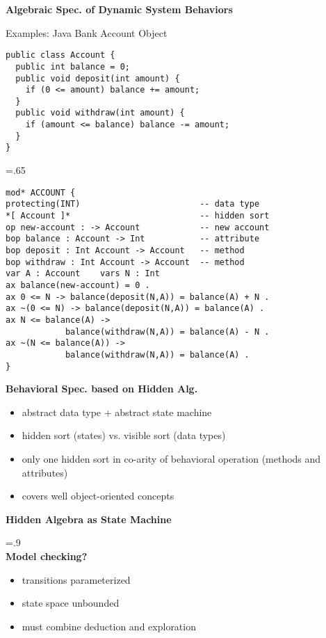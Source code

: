 \documentclass[landscape]{slides}
\begin{document}
\begin{slide}\large\parskip=0pt
\textbf{Algebraic Spec. of Dynamic System Behaviors}

\bigskip Examples: Java Bank Account Object\bigskip
\begin{verbatim}public class Account {
  public int balance = 0;
  public void deposit(int amount) {
    if (0 <= amount) balance += amount;
  }
  public void withdraw(int amount) {
    if (amount <= balance) balance -= amount;
  }
}
\end{verbatim}
\end{slide}

\begin{slide}\large\parskip=0pt\baselineskip=.65\baselineskip
\begin{verbatim}
mod* ACCOUNT {
protecting(INT)                        -- data type
*[ Account ]*                          -- hidden sort
op new-account : -> Account            -- new account
bop balance : Account -> Int           -- attribute
bop deposit : Int Account -> Account   -- method
bop withdraw : Int Account -> Account  -- method
var A : Account    vars N : Int
ax balance(new-account) = 0 .
ax 0 <= N -> balance(deposit(N,A)) = balance(A) + N .
ax ~(0 <= N) -> balance(deposit(N,A)) = balance(A) .
ax N <= balance(A) ->
            balance(withdraw(N,A)) = balance(A) - N .
ax ~(N <= balance(A)) ->
            balance(withdraw(N,A)) = balance(A) .
}
\end{verbatim}
\end{slide}

\begin{slide}\large\parskip=0pt
\textbf{Behavioral Spec. based on Hidden Alg.}

\bigskip

\begin{itemize}\itemsep=10pt
\item abstract data type + abstract state machine
\item hidden sort (states) vs. visible sort (data types)
\item only one hidden sort in co-arity of behavioral operation
  (methods and attributes)
\item covers well object-oriented concepts
\end{itemize}
\end{slide}

\begin{slide}\large\parskip=0pt
\textbf{Hidden Algebra as State Machine}

\vspace*{-1.5cm}
\hfil\epsfxsize=.9\textwidth{}\hfil\\
\textbf{Model checking?}
\begin{itemize}\itemsep=0pt
\item transitions parameterized 
\item state space unbounded
\item must combine deduction and exploration
\end{itemize}
\end{slide}
\end{document}
